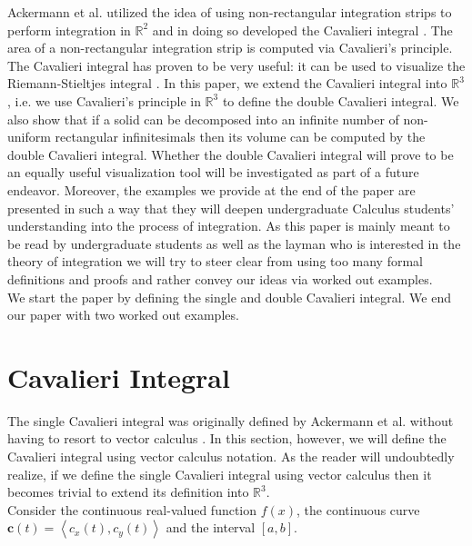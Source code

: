 \documentclass{article}
\theoremstyle{theorem}
\theoremstyle{definition}
\begin{document}
\noindent
Ackermann et al. utilized the idea of using non-rectangular integration strips to perform integration in $\mathbb{R}^2$ and in doing so developed the Cavalieri integral \cite{ackermann12}. 
The area of a non-rectangular integration strip is computed via Cavalieri’s principle. The Cavalieri integral has proven to be very useful: it can be used to visualize the Riemann-Stieltjes integral \cite{grobler19}. In this paper, we extend the Cavalieri integral into $\mathbb{R}^3$, i.e. we use Cavalieri's principle in $\mathbb{R}^3$ to define the double 
Cavalieri integral. We also show that if a solid can be decomposed into an infinite number of non-uniform rectangular infinitesimals then its volume can be computed 
by the double Cavalieri integral. Whether the double Cavalieri integral will prove to be an equally useful visualization tool will be investigated as part of a future endeavor.
Moreover, the examples we provide at the end of the paper are presented in such a way that they will deepen undergraduate Calculus students' understanding into the 
process of integration. As this paper is mainly meant to be read by undergraduate students as well as the layman who is interested in the theory of integration we will 
try to steer clear from using too many formal definitions and proofs and rather convey our ideas via worked out examples.\\ 

\noindent
We start the paper by defining the single and double Cavalieri integral. We end our paper with two worked out examples.

\section{Cavalieri Integral}
The single Cavalieri integral was originally defined by Ackermann et al. without having to resort to vector calculus \cite{ackermann12}. In this section, however, we will define the Cavalieri integral using vector calculus notation. As the reader will undoubtedly realize, if we define the single Cavalieri integral using vector calculus then it becomes trivial to
extend its definition into $\mathbb{R}^3$.\\


\noindent
Consider the continuous real-valued function $f(x)$, the continuous curve $\mathbf{c}(t)=\left <c_x(t),c_y(t) \right >$ and the interval $[a,b]$.
\end{document}
